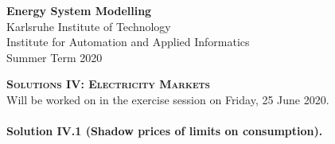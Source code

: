\documentclass[11pt,a4paper,fleqn]{scrartcl}
\begin{document}
\begin{flushright}
  \textbf{Energy System Modelling }\\
  {\small Karlsruhe Institute of Technology}\\
  {\small Institute for Automation and Applied Informatics}\\
  {\small Summer Term 2020}\\
 \end{flushright}
 
  
  \vspace{-0.5em}
  \hrulefill
  \vspace{0.3em}
 
 \begin{center}
  \textbf{\textsc{\Large Solutions IV: Electricity Markets}}\\
  \small Will be worked on in the exercise session on Friday, 25 June 2020.\\[1.5em]
 \end{center}
 

 \vspace{-0.5em}
 \hrulefill
 \vspace{0.8em}
 

\paragraph{Solution IV.1 \normalsize (Shadow prices of limits on consumption).}~\\
\end{document}
